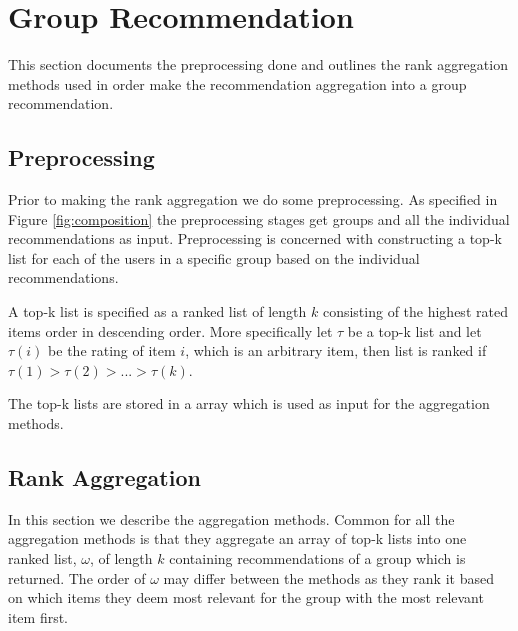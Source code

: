 \section{Group Recommendation}\label{sec:grouprecommendation}
This section documents the preprocessing done and outlines the rank aggregation methods used in order make the recommendation aggregation into a group recommendation. 

\subsection{Preprocessing}
Prior to making the rank aggregation we do some preprocessing. As specified in Figure \ref{fig:composition} the preprocessing stages get groups and all the individual recommendations as input. Preprocessing is concerned with constructing a top-k list for each of the users in a specific group based on the individual recommendations.

A top-k list is specified as a ranked list of length $k$ consisting of the highest rated items order in descending order. More specifically let $\tau$ be a top-k list and let $\tau(i)$ be the rating of item $i$, which is an arbitrary item, then list is ranked if $\tau (1) > \tau (2) > ... > \tau (k)$.

The top-k lists are stored in a array which is used as input for the aggregation methods.



\subsection{Rank Aggregation}\label{sec:aggregations}
In this section we describe the aggregation methods. Common for all the aggregation methods is that they aggregate an array of top-k lists into one ranked list, $\omega$, of length $k$ containing recommendations of a group which is returned. The order of $\omega$ may differ between the methods as they rank it based on which items they deem most relevant for the group with the most relevant item first. 





